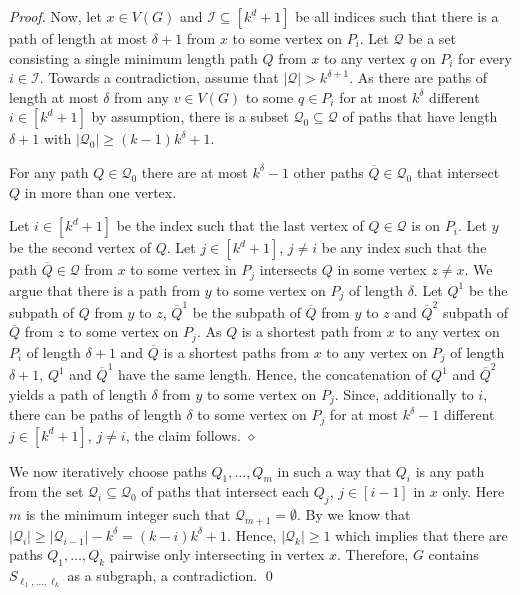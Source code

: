 \documentclass[runningheads,envcountsame]{llncs}
\newcommand{\subdivStar}[1]{S_{#1}}
\newenvironment{claimproof}
{\noindent {\em Proof of Claim:} }
{\hfill $\diamond$ \smallskip}
\begin{document}
\begin{proof}
    Now, let $x\in V(G)$ and $\mathcal{I}\subseteq [k^d+1]$ be all indices such that there is a path of length at most $\delta+1$ from $x$ to some vertex on $P_i$. Let $\mathcal{Q}$ be a set consisting a single minimum length path $Q$ from $x$ to any vertex $q$ on $P_i$ for every $i\in \mathcal{I}$. Towards a contradiction, assume that $|\mathcal{Q}|> k^{\delta+1}$.
    As there are paths of length at most $\delta$ from any $v \in V(G)$ to some $q\in P_i$ for at most $k^\delta$ different $i\in [k^d+1]$ by assumption, there is a subset $\mathcal{Q}_0\subseteq \mathcal{Q}$ of paths that have length $\delta+1$ with $|\mathcal{Q}_0|\geq (k-1)k^\delta+1$.
    \begin{mclaim}\label{claim:overlappingPaths}
        For any path $Q\in \mathcal{Q}_0$ there are at most $k^\delta-1$ other paths $\overline{Q}\in \mathcal{Q}_0$ that intersect $Q$ in more than one vertex.  
    \end{mclaim}
    \begin{claimproof}
        Let $i\in [k^d+1]$ be the index such that the last vertex of $Q\in \mathcal{Q}$ is on $P_i$. Let $y$ be the second vertex of $Q$. 
        Let $j\in [k^d+1]$, $j\not=i$ be any index such that the path $\overline{Q}\in \mathcal{Q}$ from $x$ to some vertex in $P_j$ intersects $Q$ in some vertex $z\not=x$. We argue that there is a path from $y$ to some vertex on $P_j$ of length $\delta$.  
        Let $Q^1$ be the subpath of $Q$ from $y$ to $z$, $\overline{Q}^1$ be the subpath of $\overline{Q}$ from $y$ to $z$ and $\overline{Q}^2$ subpath of $\overline{Q}$ from $z$ to some vertex on $P_j$. As $Q$ is a shortest path from $x$ to any vertex on $P_i$ of length $\delta+1$ and $\overline{Q}$ is a shortest paths from $x$ to any vertex on $P_j$ of length $\delta+1$, $Q^1$ and $\overline{Q}^1$ have the same length. Hence, the concatenation of $Q^1$ and $\overline{Q}^2$ yields a path of length $\delta$ from $y$ to some vertex on $P_j$. 
        Since, additionally to $i$, there  can be paths of length $\delta$ to some vertex on $P_j$ for at most $k^\delta-1$ different $j\in [k^d+1]$, $j\not=i$, the claim follows.
    \end{claimproof}
    
    We now iteratively choose paths $Q_1,\dots, Q_m$ in such a way that $Q_i$ is any path from the set $\mathcal{Q}_{i}\subseteq \mathcal{Q}_0$ of paths that  intersect each $Q_j$, $j\in [i-1]$ in $x$ only. Here $m$ is the minimum integer such that $\mathcal{Q}_{m+1}=\emptyset$. 
    By  we know that $|\mathcal{Q}_i|\geq |\mathcal{Q}_{i-1}|-k^\delta=(k-i)k^\delta + 1$. Hence, $|\mathcal{Q}_k|\geq 1$ which implies that there are paths $Q_1,\dots, Q_k$ pairwise only intersecting in vertex $x$. 
    Therefore, $G$ contains  $\subdivStar{\ell_1, \ldots , \ell_k}$ as a subgraph, a contradiction.
    \qed
\end{proof}
\end{document}
